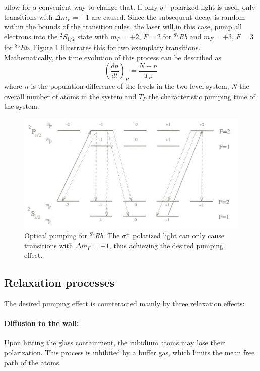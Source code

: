 allow for a convenient way to change that. If only $\sigma^+$-polarized light is used, only transitions with $\Delta m_F=+1$ are caused. Since the subsequent decay is random within the bounds of the transition rules, the laser will,in this case, pump all electrons into the $^2S_{1/2}$ state with $m_F=+2$, $F=2$ for $^{87}Rb$ and $m_F=+3$, $F=3$ for $^{85}Rb$. Figure \ref{fig:zeemanpumping} illustrates this for two exemplary transitions.\\
Mathematically, the time evolution of this process can be described as 
\begin{equation}
\left(\frac{dn}{dt}\right)_P=\frac{N-n}{T_P}
\label{eq:pumpingtime}
\end{equation}
where $n$ is the population difference of the levels in the two-level system, $N$ the overall number of atoms in the system and $T_P$ the characteristic pumping time of the system.
\begin{figure}[h]
\centering
\includegraphics[width=1.0\linewidth]{graphics/zeemanpumping}
\caption[Optical pumping schematic]{Optical pumping for $^{87}Rb$. The $\sigma^+$ polarized light can only cause transitions with $\Delta m_F=+1$, thus achieving the desired pumping effect. \cite{anleitung}}
\label{fig:zeemanpumping}
\end{figure}
\subsection{Relaxation processes}
The desired pumping effect is counteracted mainly by three relaxation effects:
\paragraph{Diffusion to the wall:}
Upon hitting the glass containment, the rubidium atoms may lose their polarization. This process is inhibited by a buffer gas, which limits the mean free path of the atoms.
